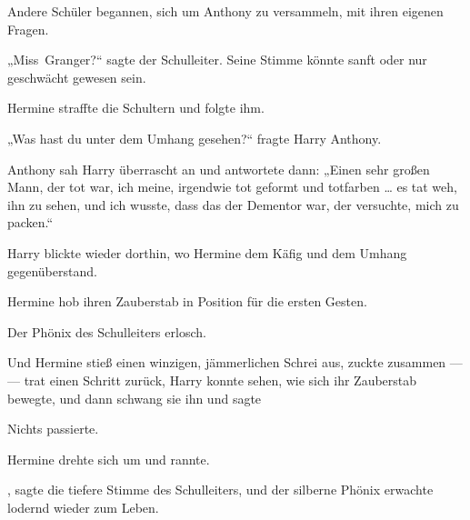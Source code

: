 Andere Schüler begannen, sich um Anthony zu versammeln, mit ihren eigenen Fragen.

„Miss~Granger?“ sagte der Schulleiter. Seine Stimme könnte sanft oder nur geschwächt gewesen sein.

Hermine straffte die Schultern und folgte ihm.

„Was hast du unter dem Umhang gesehen?“ fragte Harry Anthony.

Anthony sah Harry überrascht an und antwortete dann: „Einen sehr großen Mann, der tot war, ich meine, irgendwie tot geformt und totfarben … es tat weh, ihn zu sehen, und ich wusste, dass das der Dementor war, der versuchte, mich zu packen.“

Harry blickte wieder dorthin, wo Hermine dem Käfig und dem Umhang gegenüberstand.

Hermine hob ihren Zauberstab in Position für die ersten Gesten.

Der Phönix des Schulleiters erlosch.

Und Hermine stieß einen winzigen, jämmerlichen Schrei aus, zuckte zusammen —
— trat einen Schritt zurück, Harry konnte sehen, wie sich ihr Zauberstab bewegte, und dann schwang sie ihn und sagte 

Nichts passierte.

Hermine drehte sich um und rannte.

, sagte die tiefere Stimme des Schulleiters, und der silberne Phönix erwachte lodernd wieder zum Leben.


